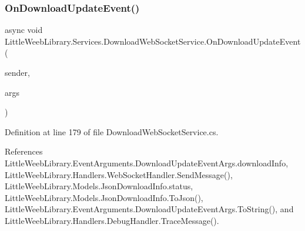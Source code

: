 \mbox{\label{class_little_weeb_library_1_1_services_1_1_download_web_socket_service_a3111908b7f7a133a80ab6ec3e81cdcbf}} 
\subsubsection{\texorpdfstring{On\+Download\+Update\+Event()}{OnDownloadUpdateEvent()}}
{\footnotesize\ttfamily async void Little\+Weeb\+Library.\+Services.\+Download\+Web\+Socket\+Service.\+On\+Download\+Update\+Event (\begin{DoxyParamCaption}\item[{object}]{sender,  }\item[{\mbox{\hyperlink{class_little_weeb_library_1_1_event_arguments_1_1_download_update_event_args}{Download\+Update\+Event\+Args}}}]{args }\end{DoxyParamCaption})\hspace{0.3cm}{\ttfamily [private]}}



Definition at line 179 of file Download\+Web\+Socket\+Service.\+cs.



References Little\+Weeb\+Library.\+Event\+Arguments.\+Download\+Update\+Event\+Args.\+download\+Info, Little\+Weeb\+Library.\+Handlers.\+Web\+Socket\+Handler.\+Send\+Message(), Little\+Weeb\+Library.\+Models.\+Json\+Download\+Info.\+status, Little\+Weeb\+Library.\+Models.\+Json\+Download\+Info.\+To\+Json(), Little\+Weeb\+Library.\+Event\+Arguments.\+Download\+Update\+Event\+Args.\+To\+String(), and Little\+Weeb\+Library.\+Handlers.\+Debug\+Handler.\+Trace\+Message().


